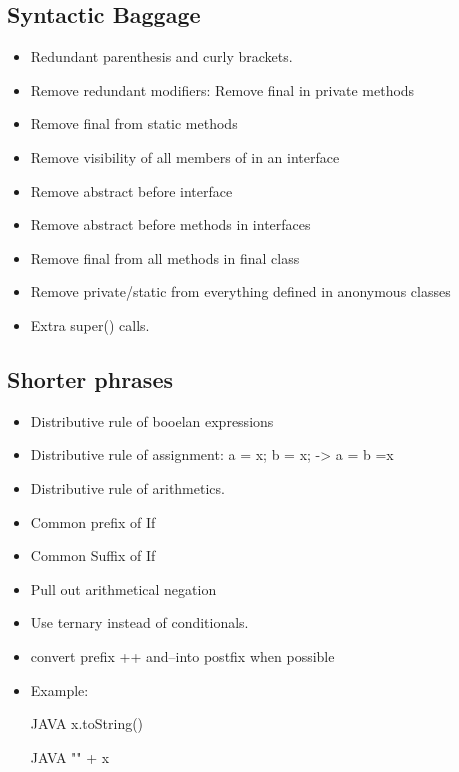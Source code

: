 \subsection{Syntactic Baggage}
\begin{itemize}
  \item Redundant parenthesis and curly brackets.
  \item Remove redundant modifiers: Remove final in private methods
  \item Remove final from static methods
  \item Remove visibility of all members of in an interface
  \item Remove abstract before interface
  \item Remove abstract before methods in interfaces
  \item Remove final from all methods in final class
  \item Remove private/static from everything defined in anonymous classes
  \item Extra super() calls.
\end{itemize}

\subsection{Shorter phrases}
\begin{itemize}
  \item Distributive rule of booelan expressions
  \item Distributive rule of assignment: a = x; b = x; -> a = b =x
  \item Distributive rule of arithmetics.
  \item Common prefix of If
  \item Common Suffix of If
  \item Pull out arithmetical negation
  \item Use ternary instead of conditionals.
  \item convert prefix ++ and--into postfix when possible
  \item Example:
\begin{code}{JAVA}
x.toString()
\end{code}
\begin{code}{JAVA}
"" + x
\end{code}
\end{itemize}

